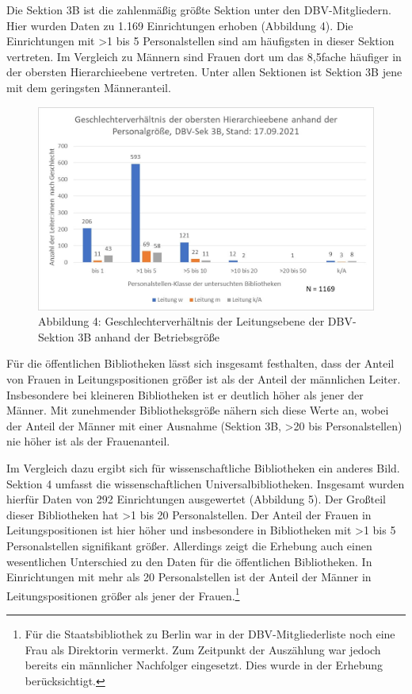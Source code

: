 \documentclass[a4paper,
fontsize=11pt,
oneside,
numbers=noperiodatend,
parskip=half-,
bibliography=totoc,
final
]{scrartcl}
\begin{document}
Die Sektion 3B ist die zahlenmäßig größte Sektion unter den
DBV-Mitgliedern. Hier wurden Daten zu 1.169 Einrichtungen erhoben
(Abbildung 4). Die Einrichtungen mit \textgreater1 bis 5 Personalstellen
sind am häufigsten in dieser Sektion vertreten. Im Vergleich zu Männern
sind Frauen dort um das 8,5fache häufiger in der obersten
Hierarchieebene vertreten. Unter allen Sektionen ist Sektion 3B jene mit
dem geringsten Männeranteil.

\begin{figure}
\centering
\includegraphics{img/Abb.04_DBV-Sek3B.jpg}
\caption{Abbildung 4: Geschlechterverhältnis der Leitungsebene der
DBV-Sektion 3B anhand der Betriebsgröße}
\end{figure}

Für die öffentlichen Bibliotheken lässt sich insgesamt festhalten, dass
der Anteil von Frauen in Leitungspositionen größer ist als der Anteil
der männlichen Leiter. Insbesondere bei kleineren Bibliotheken ist er
deutlich höher als jener der Männer. Mit zunehmender Bibliotheksgröße
nähern sich diese Werte an, wobei der Anteil der Männer mit einer
Ausnahme (Sektion 3B, \textgreater20 bis Personalstellen) nie höher ist
als der Frauenanteil.

Im Vergleich dazu ergibt sich für wissenschaftliche Bibliotheken ein
anderes Bild. Sektion 4 umfasst die wissenschaftlichen
Universalbibliotheken. Insgesamt wurden hierfür Daten von 292
Einrichtungen ausgewertet (Abbildung 5). Der Großteil dieser
Bibliotheken hat \textgreater1 bis 20 Personalstellen. Der Anteil der
Frauen in Leitungspositionen ist hier höher und insbesondere in
Bibliotheken mit \textgreater1 bis 5 Personalstellen signifikant größer.
Allerdings zeigt die Erhebung auch einen wesentlichen Unterschied zu den
Daten für die öffentlichen Bibliotheken. In Einrichtungen mit mehr als
20 Personalstellen ist der Anteil der Männer in Leitungspositionen
größer als jener der Frauen.\footnote{Für die Staatsbibliothek zu Berlin
  war in der DBV-Mitgliederliste noch eine Frau als Direktorin vermerkt.
  Zum Zeitpunkt der Auszählung war jedoch bereits ein männlicher
  Nachfolger eingesetzt. Dies wurde in der Erhebung berücksichtigt.}
\end{document}
